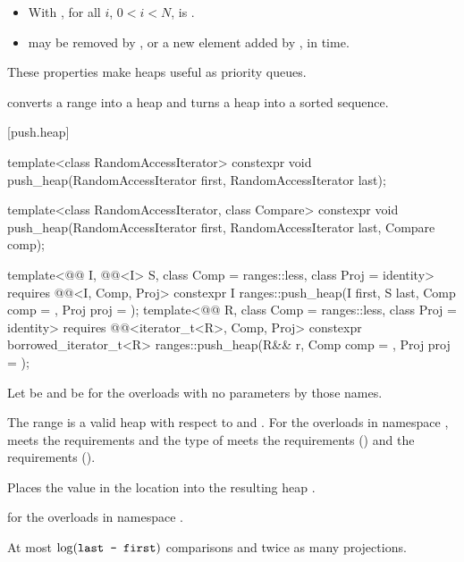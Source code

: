 \begin{itemize}
\item
  With , for all $i$, $0 < i < N$,
  is .
\item
   may be removed by , or
  a new element added by ,
  in  time.
\end{itemize}

\pnum
These properties make heaps useful as priority queues.

\pnum
{} converts a range into a heap and
 turns a heap into a sorted sequence.

[push.heap]{}

%
\begin{itemdecl}
template<class RandomAccessIterator>
  constexpr void push_heap(RandomAccessIterator first, RandomAccessIterator last);

template<class RandomAccessIterator, class Compare>
  constexpr void push_heap(RandomAccessIterator first, RandomAccessIterator last,
                           Compare comp);

template<@@ I, @@<I> S, class Comp = ranges::less,
         class Proj = identity>
  requires @@<I, Comp, Proj>
  constexpr I
    ranges::push_heap(I first, S last, Comp comp = {}, Proj proj = {});
template<@@ R, class Comp = ranges::less, class Proj = identity>
  requires @@<iterator_t<R>, Comp, Proj>
  constexpr borrowed_iterator_t<R>
    ranges::push_heap(R&& r, Comp comp = {}, Proj proj = {});
\end{itemdecl}

\begin{itemdescr}
\pnum
Let  be 
and  be 
for the overloads with no parameters by those names.

\pnum
\expects
The range 
is a valid heap with respect to  and .
For the overloads in namespace ,
 meets
the  requirements and
the type of  meets
the  requirements () and
the  requirements ().

\pnum
\effects
Places the value in the location 
into the resulting heap .

\pnum
\returns
{} for the overloads in namespace .

\pnum
\complexity
At most $\log(\texttt{\protect last - first})$ comparisons and twice as many projections.
\end{itemdescr}

